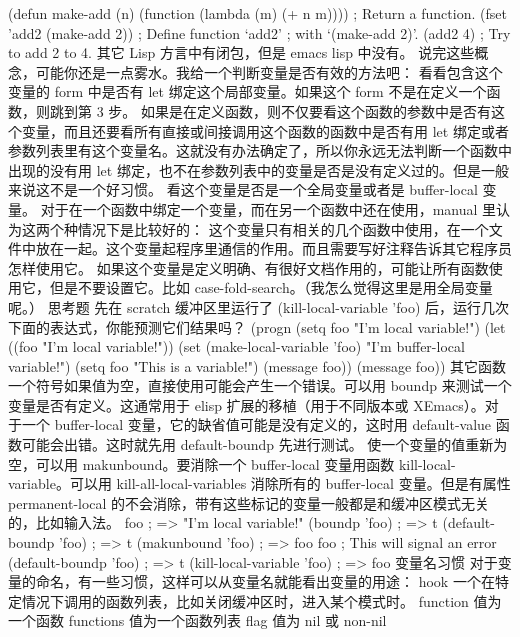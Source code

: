 \documentclass[11pt]{ctexart}
\begin{document}
\begin{SCR}
(defun make-add (n)
(function (lambda (m) (+ n m))))      ; Return a function.
(fset 'add2 (make-add 2))               ; Define function `add2'
;   with `(make-add 2)'.
(add2 4)                                ; Try to add 2 to 4.
其它 Lisp 方言中有闭包，但是 emacs lisp 中没有。
说完这些概念，可能你还是一点雾水。我给一个判断变量是否有效的方法吧：
看看包含这个变量的 form 中是否有 let 绑定这个局部变量。如果这个 form 不是在定义一个函数，则跳到第 3 步。
如果是在定义函数，则不仅要看这个函数的参数中是否有这个变量，而且还要看所有直接或间接调用这个函数的函数中是否有用 let 绑定或者参数列表里有这个变量名。这就没有办法确定了，所以你永远无法判断一个函数中出现的没有用 let 绑定，也不在参数列表中的变量是否是没有定义过的。但是一般来说这不是一个好习惯。
看这个变量是否是一个全局变量或者是 buffer-local 变量。
对于在一个函数中绑定一个变量，而在另一个函数中还在使用，manual 里认为这两个种情况下是比较好的：
这个变量只有相关的几个函数中使用，在一个文件中放在一起。这个变量起程序里通信的作用。而且需要写好注释告诉其它程序员怎样使用它。
如果这个变量是定义明确、有很好文档作用的，可能让所有函数使用它，但是不要设置它。比如 case-fold-search。（我怎么觉得这里是用全局变量呢。）
思考题
先在 scratch 缓冲区里运行了 (kill-local-variable 'foo) 后，运行几次下面的表达式，你能预测它们结果吗？
(progn
(setq foo "I'm local variable!")
(let ((foo "I'm local variable!"))
(set (make-local-variable 'foo) "I'm buffer-local variable!")
(setq foo "This is a variable!")
(message foo))
(message foo))
其它函数
一个符号如果值为空，直接使用可能会产生一个错误。可以用 boundp 来测试一个变量是否有定义。这通常用于 elisp 扩展的移植（用于不同版本或 XEmacs）。对于一个 buffer-local 变量，它的缺省值可能是没有定义的，这时用 default-value 函数可能会出错。这时就先用 default-boundp 先进行测试。
使一个变量的值重新为空，可以用 makunbound。要消除一个 buffer-local 变量用函数 kill-local-variable。可以用 kill-all-local-variables 消除所有的 buffer-local 变量。但是有属性 permanent-local 的不会消除，带有这些标记的变量一般都是和缓冲区模式无关的，比如输入法。
foo                                     ; => "I'm local variable!"
(boundp 'foo)                           ; => t
(default-boundp 'foo)                   ; => t
(makunbound 'foo)                       ; => foo
foo                                     ; This will signal an error
(default-boundp 'foo)                   ; => t
(kill-local-variable 'foo)              ; => foo
变量名习惯
对于变量的命名，有一些习惯，这样可以从变量名就能看出变量的用途：
hook 一个在特定情况下调用的函数列表，比如关闭缓冲区时，进入某个模式时。
function 值为一个函数
functions 值为一个函数列表
flag 值为 nil 或 non-nil

\end{SCR}
\end{document}

